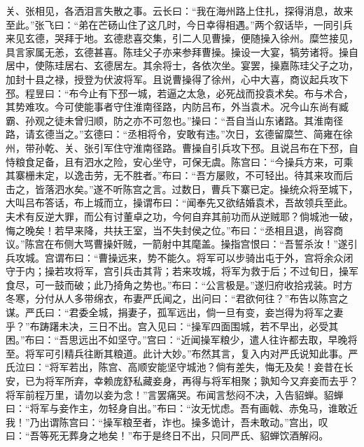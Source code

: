 关、张相见，各洒泪言失散之事。云长曰：“我在海州路上住扎，探得消息，故来至此。”张飞曰：“弟在芒砀山住了这几时，今日幸得相遇。”两个叙话毕，一同引兵来见玄德，哭拜于地。玄德悲喜交集，引二人见曹操，便随操入徐州。糜竺接见，具言家属无恙，玄德甚喜。陈珪父子亦来参拜曹操。操设一大宴，犒劳诸将。操自居中，使陈珪居右、玄德居左。其余将士，各依次坐。宴罢，操嘉陈珪父子之功，加封十县之禄，授登为伏波将军。且说曹操得了徐州，心中大喜，商议起兵攻下邳。程昱曰：“布今止有下邳一城，若逼之太急，必死战而投袁术矣。布与术合，其势难攻。今可使能事者守住淮南径路，内防吕布，外当袁术。况今山东尚有臧霸、孙观之徒未曾归顺，防之亦不可忽也。”操曰：“吾自当山东诸路。其淮南径路，请玄德当之。”玄德曰：“丞相将令，安敢有违。”次日，玄德留糜竺、简雍在徐州，带孙乾、关、张引军住守淮南径路。曹操自引兵攻下邳。且说吕布在下邳，自恃粮食足备，且有泗水之险，安心坐守，可保无虞。陈宫曰：“今操兵方来，可乘其寨栅未定，以逸击劳，无不胜者。”布曰：“吾方屡败，不可轻出。待其来攻而后击之，皆落泗水矣。”遂不听陈宫之言。过数日，曹兵下寨已定。操统众将至城下，大叫吕布答话，布上城而立，操谓布曰：“闻奉先又欲结婚袁术，吾故领兵至此。夫术有反逆大罪，而公有讨董卓之功，今何自弃其前功而从逆贼耶？倘城池一破，悔之晚矣！若早来降，共扶王室，当不失封侯之位。”布曰：“丞相且退，尚容商议。”陈宫在布侧大骂曹操奸贼，一箭射中其麾盖。操指宫恨曰：“吾誓杀汝！”遂引兵攻城。宫谓布曰：“曹操远来，势不能久。将军可以步骑出屯于外，宫将余众闭守于内；操若攻将军，宫引兵击其背；若来攻城，将军为救于后；不过旬日，操军食尽，可一鼓而破；此乃掎角之势也。”布曰：“公言极是。”遂归府收拾戎装。时方冬寒，分付从人多带绵衣，布妻严氏闻之，出问曰：“君欲何往？”布告以陈宫之谋。严氏曰：“君委全城，捐妻子，孤军远出，倘一旦有变，妾岂得为将军之妻乎？”布踌躇未决，三日不出。宫入见曰：“操军四面围城，若不早出，必受其困。”布曰：“吾思远出不如坚守。”宫曰：“近闻操军粮少，遣人往许都去取，早晚将至。将军可引精兵往断其粮道。此计大妙。”布然其言，复入内对严氏说知此事。严氏泣曰：“将军若出，陈宫、高顺安能坚守城池？倘有差失，悔无及矣！妾昔在长安，已为将军所弃，幸赖庞舒私藏妾身，再得与将军相聚；孰知今又弃妾而去乎？将军前程万里，请勿以妾为念！”言罢痛哭。布闻言愁闷不决，入告貂蝉。貂蝉曰：“将军与妾作主，勿轻身自出。”布曰：“汝无忧虑。吾有画戟、赤兔马，谁敢近我！”乃出谓陈宫曰：“操军粮至者，诈也。操多诡计，吾未敢动。”宫出，叹曰：“吾等死无葬身之地矣！”布于是终日不出，只同严氏、貂蝉饮酒解闷。


